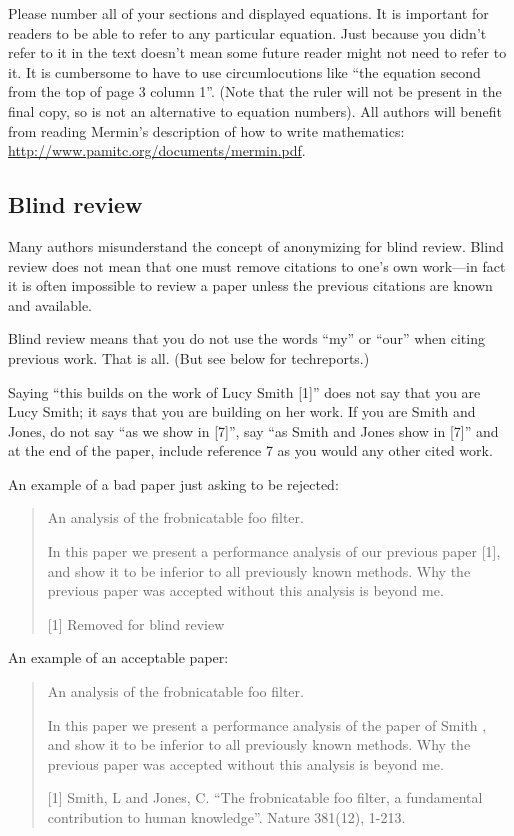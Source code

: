 \documentclass[12pt,letterpaper]{article}
\begin{document}
Please number all of your sections and displayed equations.  It is
important for readers to be able to refer to any particular equation.  Just
because you didn't refer to it in the text doesn't mean some future reader
might not need to refer to it.  It is cumbersome to have to use
circumlocutions like ``the equation second from the top of page 3 column
1''.  (Note that the ruler will not be present in the final copy, so is not
an alternative to equation numbers).  All authors will benefit from reading
Mermin's description of how to write mathematics:
\url{http://www.pamitc.org/documents/mermin.pdf}.


\subsection{Blind review}

Many authors misunderstand the concept of anonymizing for blind
review.  Blind review does not mean that one must remove
citations to one's own work---in fact it is often impossible to
review a paper unless the previous citations are known and
available.

Blind review means that you do not use the words ``my'' or ``our''
when citing previous work.  That is all.  (But see below for
techreports.)

Saying ``this builds on the work of Lucy Smith [1]'' does not say
that you are Lucy Smith; it says that you are building on her
work.  If you are Smith and Jones, do not say ``as we show in
[7]'', say ``as Smith and Jones show in [7]'' and at the end of the
paper, include reference 7 as you would any other cited work.

An example of a bad paper just asking to be rejected:
\begin{quote}
\begin{center}
    An analysis of the frobnicatable foo filter.
\end{center}

   In this paper we present a performance analysis of our
   previous paper [1], and show it to be inferior to all
   previously known methods.  Why the previous paper was
   accepted without this analysis is beyond me.

   [1] Removed for blind review
\end{quote}


An example of an acceptable paper:

\begin{quote}
\begin{center}
     An analysis of the frobnicatable foo filter.
\end{center}

   In this paper we present a performance analysis of the
   paper of Smith \etal [1], and show it to be inferior to
   all previously known methods.  Why the previous paper
   was accepted without this analysis is beyond me.

   [1] Smith, L and Jones, C. ``The frobnicatable foo
   filter, a fundamental contribution to human knowledge''.
   Nature 381(12), 1-213.
\end{quote}
\end{document}
